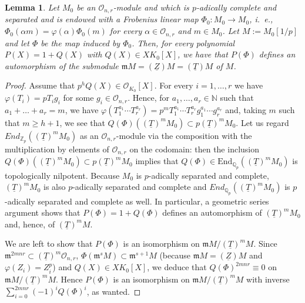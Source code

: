 \documentclass[asterisque,english]{smfart}
\newtheorem{lemma}[theo]{Lemma}
\begin{document}
\begin{lemma}\label{lemma:PHIM0}
Let $M_{0}$ be an $\mathcal{O}_{n,r}$-module and which is $p$-adically
complete and separated and is endowed with a Frobenius linear map $\Phi
_{0}:M_{0}\rightarrow M_{0}$, i.~e., $\Phi _{0}\left( \alpha m\right) =\varphi
\left( \alpha \right) \Phi _{0}\left( m\right) $ for every $\alpha \in 
\mathcal{O}_{n,r}$ and $m\in M_{0}$. Let $M:=M_{0}\left[ 1/p\right] $ and
let $\Phi $ be the map induced by $\Phi _{0}$. Then, for every polynomial $
P\left( X\right) =1+Q\left( X\right) $ with $Q\left( X\right) \in XK_0
\left[ X\right] $, we have that $P\left( \Phi \right) $ defines an
automorphism of the submodule $\mathfrak{m}M=\left( \underline{Z}\right)
M=\left( \underline{T}\right) M$ of $M$.
\end{lemma}

\begin{proof}
Assume that $p^{h}Q\left( X\right) \in \mathcal{O}_{K_0}\left[ X\right] $.
For every $i=1,\ldots,r$ we have $\varphi \left( T_{i}\right) =pT_{i}g_{i}$ for some $g_{i}\in \mathcal{O}
_{n,r}$. Hence, for $a_1,\ldots,a_r\in \mathbb{N}$ such that $a_1+\ldots + a_r=m$, we have $\varphi \left( T_{1}^{a_1}\cdots T_r^{a_r}\right)
=p^{m}T_{1}^{a_1}\cdots T_r^{a_r}g_{1}^{a_1}\cdots g_r^{a_r}$ and, taking $m$ such that $m\geq h+1$, we see
that $Q\left( \Phi \right) \left( \left( \underline{T}\right)
^{m}M_{0}\right) \subset p\left( \underline{T}\right) ^{m}M_{0}$. Let us
regard $End_{\mathbb{Z}_{p}}\left( \left( \underline{T}\right)
^{m}M_{0}\right) $ as an $\mathcal{O}_{n,r}$-module via the composition with
the multiplication by elements of $\mathcal{O}_{n,r}$ on the codomain: then the inclusion $Q\left( \Phi \right) \left( \left( 
\underline{T}\right) ^{m}M_{0}\right) \subset p\left( \underline{T}\right)
^{m}M_{0}$ implies that $Q\left( \Phi \right) \in \mathrm{End}_{\mathbb{Q}_{p}}\left(
\left( \underline{T}\right) ^{m}M_{0}\right) $ is topologically nilpotent.
Because $M_{0}$ is $p$-adically separated and complete, $\left( \underline{T}%
\right) ^{m}M_{0}$ is also $p$-adically separated and complete and $End_{\mathbb{Q}
_{p}}\left( \left( \underline{T}\right) ^{m}M_{0}\right) $ is $p$
-adically separated and complete as well. In particular, a geometric series argument shows that
$P\left( \Phi \right) =1+Q\left( \Phi \right)$ defines an automorphism of
$\left(\underline{T}\right) ^{m}M_{0}$ and, hence, of $\left(\underline{T}\right) ^{m}M$.

We are left to show that $P\left( \Phi \right) $ is an isomorphism on $
\mathfrak{m}M/ \left( \underline{T}\right) ^{m}M$. Since $\mathfrak{m}
^{2mnr}\subset \left( \underline{T}\right) ^{m}\mathcal{O}
_{n,r}$, $\Phi \left( \mathfrak{m}^{s}M\right) \subset \mathfrak{m}^{s+1}M$
(because $\mathfrak{m}M=\left( \underline{Z}\right) M$ and $\varphi \left(
Z_{i}\right) =Z_{i}^{p}$) and $Q\left( X\right) \in XK_0\left[ X\right] $,
we deduce that $Q\left( \Phi \right) ^{2mnr}\equiv 0$ on $
\mathfrak{m}M/\left( \underline{T}\right) ^{m}M$. Hence $P\left(
\Phi \right) $ is an isomorphism on $\mathfrak{m}M/\left( \underline{T
}\right) ^{m}M$ with inverse $\sum\nolimits_{i=0}^{2mnr}\left( -1\right) ^{i}Q\left( \Phi \right) ^{i}$, as wanted.
\end{proof}
\end{document}
